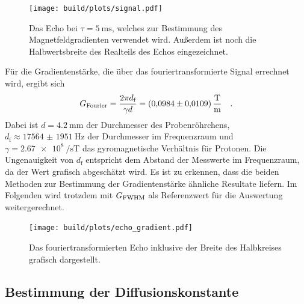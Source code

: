 \begin{figure}[H]
  \centering
  \texttt{[image: build/plots/signal.pdf]}
  \caption{Das Echo bei $\tau = \SI{5}{\milli\second}$, welches zur Bestimmung des Magnetfeldgradienten verwendet wird. 
  Außerdem ist noch die Halbwertsbreite des Realteils des Echos eingezeichnet.}
\label{img:four1}
\end{figure}

\noindent
Für die Gradientenstärke, die über das fouriertransformierte Signal errechnet wird, ergibt sich
\begin{equation*}
  G_\t{Fourier} = \frac{2\pi d_\text{f}}{\gamma d} = \SI{0.0984(109)}{\tesla\per\metre} \quad.
\end{equation*}
Dabei ist  $d = \SI{4.2}{\milli\metre}$ \cite{V49} der Durchmesser des Probenröhrchens, $d_\text{f} \approx \SI{17564(1951)}{\hertz}$ der Durchmesser im Frequenzraum und
$\gamma = \SI{2.67e8}{\per\second\tesla}$ \cite{gyro} das gyromagnetische Verhältnis für Protonen.
Die Ungenauigkeit von $d_\text{f}$ entspricht dem Abstand der Messwerte im Frequenzraum, da der Wert grafisch abgeschätzt wird. 
Es ist zu erkennen, dass die beiden Methoden zur Bestimmung der Gradientenstärke ähnliche Resultate liefern. 
Im Folgenden wird trotzdem mit $G_\t{FWHM}$ als Referenzwert für die Auswertung weitergerechnet.

\begin{figure}[H]
  \centering
  \texttt{[image: build/plots/echo\_gradient.pdf]}
  \caption{Das fouriertransformierten Echo inklusive der Breite des Halbkreises grafisch dargestellt. }
\label{img:four2}
\end{figure}


\subsection{Bestimmung der Diffusionskonstante}


